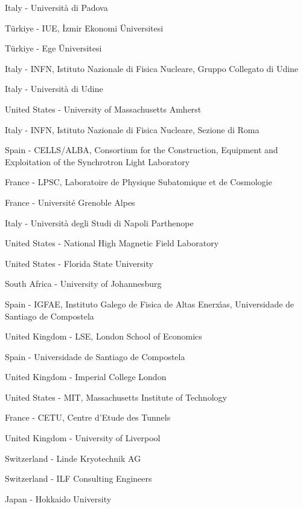\item[$^{167}$] Italy - Universit{\`a} di Padova
\item[$^{168}$] T{\"u}rkiye - IUE, {\.{I}}zmir Ekonomi {\"U}niversitesi
\item[$^{169}$] T{\"u}rkiye - Ege {\"U}niversitesi
\item[$^{170}$] Italy - INFN, Istituto Nazionale di Fisica Nucleare, Gruppo Collegato di Udine
\item[$^{171}$] Italy - Universit{\`a} di Udine
\item[$^{172}$] United States - University of Massachusetts Amherst
\item[$^{173}$] Italy - INFN, Istituto Nazionale di Fisica Nucleare, Sezione di Roma
\item[$^{174}$] Spain - CELLS/ALBA, Consortium for the Construction, Equipment and Exploitation of the Synchrotron Light Laboratory
\item[$^{175}$] France - LPSC, Laboratoire de Physique Subatomique et de Cosmologie
\item[$^{176}$] France - Universit{\'e} Grenoble Alpes
\item[$^{177}$] Italy - Universit{\`a} degli Studi di Napoli Parthenope
\item[$^{178}$] United States - National High Magnetic Field Laboratory
\item[$^{179}$] United States - Florida State University
\item[$^{180}$] South Africa - University of Johannesburg
\item[$^{181}$] Spain - IGFAE, Instituto Galego de Fisica de Altas Enerx{\'\i}as, Universidade de Santiago de Compostela
\item[$^{182}$] United Kingdom - LSE, London School of Economics
\item[$^{183}$] Spain - Universidade de Santiago de Compostela
\item[$^{184}$] United Kingdom - Imperial College London
\item[$^{185}$] United States - MIT, Massachusetts Institute of Technology
\item[$^{186}$] France - CETU, Centre d'Etude des Tunnels
\item[$^{187}$] United Kingdom - University of Liverpool
\item[$^{188}$] Switzerland - Linde Kryotechnik AG
\item[$^{189}$] Switzerland - ILF Consulting Engineers
\item[$^{190}$] Japan - Hokkaido University
